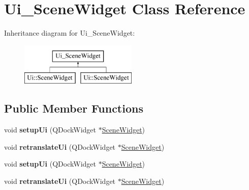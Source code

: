 \hypertarget{class_ui___scene_widget}{\section{\-Ui\-\_\-\-Scene\-Widget \-Class \-Reference}
\label{class_ui___scene_widget}
}
\-Inheritance diagram for \-Ui\-\_\-\-Scene\-Widget\-:\begin{figure}[H]
\begin{center}
\leavevmode
\includegraphics[height=2.000000cm]{class_ui___scene_widget}
\end{center}
\end{figure}
\subsection*{\-Public \-Member \-Functions}
\begin{DoxyCompactItemize}
\item 
\hypertarget{class_ui___scene_widget_a660be7e59f8ed3eac1f46bd10ccdd7d4}{void {\bfseries setup\-Ui} (\-Q\-Dock\-Widget $\ast$\hyperlink{class_scene_widget}{\-Scene\-Widget})}\label{class_ui___scene_widget_a660be7e59f8ed3eac1f46bd10ccdd7d4}

\item 
\hypertarget{class_ui___scene_widget_acfbd9ff20d069c71c81328c08f6803c9}{void {\bfseries retranslate\-Ui} (\-Q\-Dock\-Widget $\ast$\hyperlink{class_scene_widget}{\-Scene\-Widget})}\label{class_ui___scene_widget_acfbd9ff20d069c71c81328c08f6803c9}

\item 
\hypertarget{class_ui___scene_widget_a660be7e59f8ed3eac1f46bd10ccdd7d4}{void {\bfseries setup\-Ui} (\-Q\-Dock\-Widget $\ast$\hyperlink{class_scene_widget}{\-Scene\-Widget})}\label{class_ui___scene_widget_a660be7e59f8ed3eac1f46bd10ccdd7d4}

\item 
\hypertarget{class_ui___scene_widget_acfbd9ff20d069c71c81328c08f6803c9}{void {\bfseries retranslate\-Ui} (\-Q\-Dock\-Widget $\ast$\hyperlink{class_scene_widget}{\-Scene\-Widget})}\label{class_ui___scene_widget_acfbd9ff20d069c71c81328c08f6803c9}

\end{DoxyCompactItemize}
